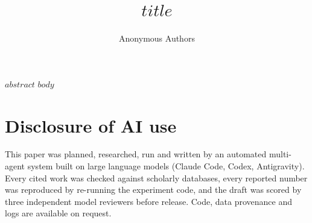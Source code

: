 \documentclass[11pt]{article}
\title{$title$}
\author{Anonymous Authors}
\date{}
\begin{document}
\maketitle
$abstract$
$body$

\section*{Disclosure of AI use}
This paper was planned, researched, run and written by an automated multi-agent system built on large
language models (Claude Code, Codex, Antigravity). Every cited work was checked against scholarly databases, every
reported number was reproduced by re-running the experiment code, and the draft was scored by three
independent model reviewers before release. Code, data provenance and logs are available on request.
\clearpage{}\label{refsstart}


\label{lastpage}
\end{document}
